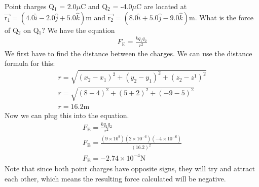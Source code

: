 \documentclass[../em.tex]{subfiles}
\begin{document}
\begin{example}
    Point charges Q$_1$ = 2.0$\mu$C and Q$_2$ = -4.0$\mu$C are located at $\vec{\text{r}_1} = (4.0\hat{i}-2.0\hat{j}+5.0\hat{k})$m and 
    $\vec{\text{r}_2} = (8.0\hat{i}+5.0\hat{j}-9.0\hat{k})$m. What is the force of Q$_2$ on Q$_1$?
    \smallbreak
    We have the equation 
    \begin{align*}
        F_\text{E}=\frac{kq_1q_2}{r^2}
    \end{align*}
    We first have to find the distance between the charges. We can use the distance formula for this:
    \begin{align*}
        r = \sqrt{(x_2-x_1)^2+(y_2-y_1)^2+(z_2-z^1)^2}\\
        r = \sqrt{(8-4)^2+(5+2)^2+(-9-5)^2}\\
        r = 16.2 \text{m}
    \end{align*}
    Now we can plug this into the equation.
    \begin{align*}
        F_\text{E}=\frac{kq_1q_2}{r^2}\\
        F_\text{E}=\frac{(9\times10^9)(2\times10^{-6})(-4\times10^{-6})}{(16.2)^2}\\
        F_\text{E}=-2.74\times10^{-4}\text{N}
    \end{align*}
    Note that since both point charges have opposite signs, they will try and attract each other, which means the resulting force calculated 
    will be negative.
\end{example}
\end{document}
